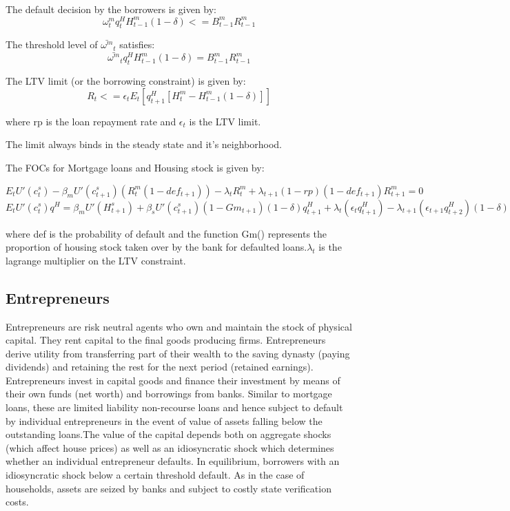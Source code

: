 \documentclass[12pt]{article}
\numberwithin{equation}{section}
\begin{document}
\begin{appendix}
The default decision by the borrowers is given by:
\begin{equation}
{{\omega^m_{t} }}q^H_{t} H^m_{t-1}(1-\delta) <= B^m_{t-1}R^m_{t-1}
\end{equation}

The threshold level of $\bar{\omega^m}_t$ satisfies:
\begin{equation}
\bar{\omega^m}_t q^H_{t} H^m_{t-1}(1-\delta) = B^m_{t-1}R^m_{t-1}
\end{equation}


The LTV limit (or the borrowing constraint) is given by:
\begin{equation}
[B^m_{t}-(1-rp)B^m_{t-1}]R_{t} <=\epsilon_{t} E_t[q^H_{t+1} [H^m_t-H^m_{t-1}(1-\delta)]]
\end{equation}

where rp is the loan repayment rate and $\epsilon_{t}$ is the LTV limit.

The limit always binds in the steady state and it's neighborhood.

The FOCs for Mortgage loans and Housing stock is given by:

\begin{equation}
E_t{U'(c^{s}_{t})-\beta_m U'(c^{s}_{t+1})(R^m_{t}(1-def_{t+1}))-\lambda_{t}R^m_{t}+\lambda_{t+1}(1-rp)(1-def_{t+1})R^m_{t+1}=0}
\end{equation}
\begin{equation}
E_t{U'(c^{s}_{t})q^H = \beta_m U'(H^{s}_{t+1}) + \beta_sU'(c^{s}_{t+1})(1-Gm_{t+1})(1-\delta)q^H_{t+1}+\lambda_{t}(\epsilon_{t} q^H_{t+1})-\lambda_{t+1}(\epsilon_{t+1} q^H_{t+2})(1-\delta)}
\end{equation}

where def is the probability of default and the function Gm() represents the proportion of housing stock taken over by the bank for defaulted loans.$\lambda_{t}$ is the lagrange multiplier on the LTV constraint.




\subsection*{Entrepreneurs}

Entrepreneurs are risk neutral agents who own and maintain the stock of physical capital. They rent  capital to the final goods producing firms. Entrepreneurs derive utility from transferring part of their wealth to the saving dynasty (paying dividends) and retaining the rest for the next period (retained earnings). Entrepreneurs invest in capital goods and finance their investment by means of their own funds (net worth) and borrowings from banks. Similar to mortgage loans, these are limited liability non-recourse loans and hence subject to default by individual entrepreneurs in the event of value of assets falling below the outstanding loans.The value of the capital depends both on aggregate shocks (which affect house prices) as well as an idiosyncratic shock which determines whether an individual entrepreneur defaults. In equilibrium, borrowers with an idiosyncratic shock below a certain threshold default.  As in the case of households, assets are seized by banks and subject to costly state verification costs. 


\end{appendix}
\end{document}
